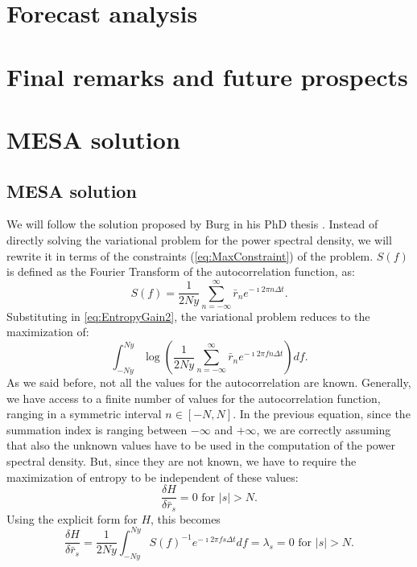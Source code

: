 \documentclass[twocolumn,showpacs,preprintnumbers,nofootinbib,prd,
superscriptaddress,10pt]{revtex4-1}
\begin{document}
\section{Forecast analysis}
\section{Final remarks and future prospects}

\appendix
\section{MESA solution} \label{sec:MESA_solution}
\subsection{MESA solution}
We will follow the solution proposed by Burg in his PhD thesis \cite{burg1975maximum}. Instead of directly solving the variational problem for the power spectral density, we will rewrite it in terms of the constraints (\ref{eq:MaxConstraint}) of the problem. $S(f)$ is defined as the Fourier Transform of the autocorrelation function, as: 
\begin{equation}
    S(f) = \frac{1}{2 Ny}\sum_{n = -\infty}^{\infty} \bar r_n e^{- \imath 2 \pi n \Delta t}.
\end{equation}
Substituting in \ref{eq:EntropyGain2}, the variational problem reduces to the maximization of: 
\begin{equation}
    \int_{-Ny}^{Ny}  
    \log\left(\frac{1}{2 Ny}\sum_{n = -\infty}^{\infty} \bar r_n e^{-\imath 2 \pi f n \Delta t} 
    \right) df.
\end{equation}
As we said before, not all the values for the autocorrelation are known. Generally, we have access to a finite number of values for the autocorrelation function, ranging in a symmetric interval $n \in [-N, N]$. 
In the previous equation, since the summation index is ranging between $-\infty$ and $+\infty$, we are correctly assuming that also the unknown values have to be used in the computation of the power spectral density. But, since they are not known, we have to require the maximization of entropy to be independent of these values:
\begin{equation}\nonumber 
    \frac{\delta H}{\delta \bar r_s} = 0 \text{ for } \vert s \vert > N. 
\end{equation}
Using the explicit form for $H$, this becomes
\begin{equation}
      \frac{\delta H}{\delta \bar r_s} = \frac{1}{2Ny}\int_{-Ny}^{Ny} S(f)^{-1}e^{-\imath 2 \pi f s \Delta t } df = \lambda_s = 0 \text{ for } \vert s \vert > N. 
\end{equation}
\end{document}
